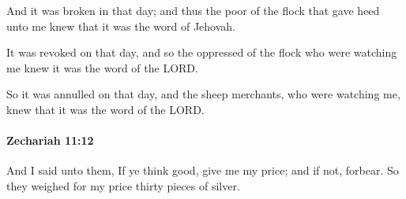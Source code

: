 			\begin{versebox}
					\item[BHS] 
					\item[LXX] 
					\item[ASV] And it was broken in that day; and thus the poor of the flock that gave heed unto me knew that it was the word of Jehovah.
					\item[NIV] It was revoked on that day, and so the oppressed of the flock who were watching me knew it was the word of the LORD.
					\item[NRSV] So it was annulled on that day, and the sheep merchants, who were watching me, knew that it was the word of the LORD.
			\end{versebox}

		\paragraph{Zechariah 11:12} %
			\label{ZECHARIAH-11-12}

			And I said unto them, If ye think good, give me my price; and if not, forbear. So they weighed for my price thirty pieces of silver.

